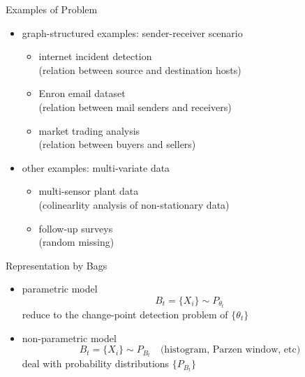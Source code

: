 \documentclass[fleqn,aspectratio=1610]{beamer}
\begin{document}
\begin{frame}[label={sec:org90e5879}]{Examples of Problem}
\begin{itemize}
\item graph-structured examples: sender-receiver scenario
\begin{itemize}
\item internet incident detection \\[0pt]
(relation between source and destination hosts)
\item Enron email dataset \\[0pt]
(relation between mail senders and receivers)
\item market trading analysis \\[0pt]
(relation between buyers and sellers)
\end{itemize}

\item other examples: multi-variate data
\begin{itemize}
\item multi-sensor plant data \\[0pt]
(colinearlity analysis of non-stationary data)
\item follow-up surveys \\[0pt]
(random missing)
\end{itemize}
\end{itemize}
\end{frame}

\begin{frame}[label={sec:orgf853e87}]{Representation by Bags}
\begin{itemize}
\item parametric model
\begin{equation}
  B_t=\{X_{i}\}\sim P_{\theta_t}
\end{equation}
reduce to the change-point detection problem of
\(\{\theta_t\}\)
\item non-parametric model
\begin{equation}
  B_t=\{X_{i}\}\sim P_{B_t}
  \quad\text{(histogram, Parzen window, etc)}
\end{equation}
deal with probability distributions \(\{P_{B_t}\}\)
\end{itemize}
\end{frame}
\end{document}
